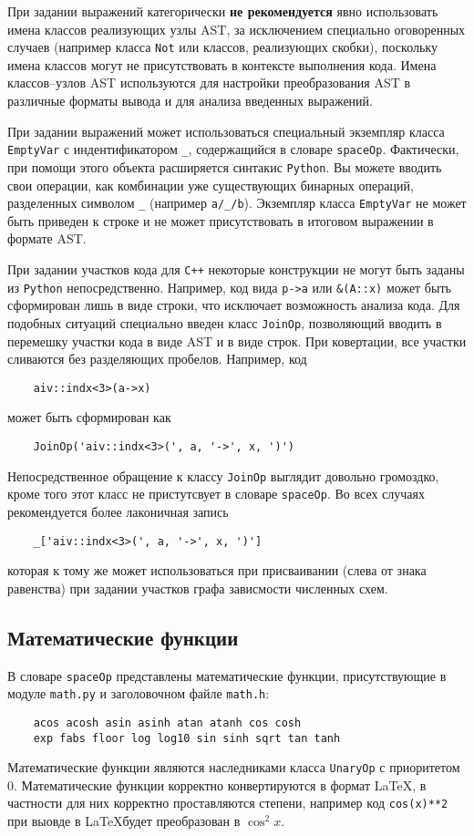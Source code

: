 При задании выражений категорически {\bf не рекомендуется} явно использовать имена классов реализующих узлы AST, за исключением специально оговоренных случаев 
(например класса \verb'Not' или классов, реализующих скобки), поскольку имена классов могут не присутствовать в контексте выполнения кода.
Имена классов--узлов AST используются для настройки преобразования AST в различные форматы вывода и для анализа введенных выражений.

При задании выражений может использоваться специальный экземпляр класса \verb'EmptyVar' с индентификатором \verb'_', содержащийся в словаре \verb'spaceOp'. 
Фактически, при помощи этого объекта расширяется синтакис \verb'Python'. Вы можете вводить свои операции, как комбинации уже существующих
бинарных операций, разделенных символом \verb'_' (например \verb'a/_/b'). Экземпляр класса \verb'EmptyVar' не может быть приведен к строке и не 
может присутствовать в итоговом выражении в формате AST. 

При задании участков кода для \verb'C++' некоторые конструкции не могут быть заданы из \verb'Python' непосредственно. Например, код вида \verb'p->a' или
\verb'&(A::x)' может быть сформирован лишь в виде строки, что исключает возможность анализа кода. Для подобных ситуаций специально введен класс \verb'JoinOp',
позволяющий вводить в перемешку участки кода в виде AST и в виде строк. При ковертации, все участки сливаются без разделяющих пробелов.  Например, код
\begin{verbatim}
    aiv::indx<3>(a->x)
\end{verbatim}
может быть сформирован как
\begin{verbatim}
    JoinOp('aiv::indx<3>(', a, '->', x, ')')
\end{verbatim}
Непосредственное обращение к классу \verb'JoinOp' выглядит довольно громоздко, кроме того этот класс не пристутсвует в словаре \verb'spaceOp'. 
Во всех случаях рекомендуется более лаконичная запись
\begin{verbatim}
    _['aiv::indx<3>(', a, '->', x, ')']
\end{verbatim}
которая к тому же может использоваться при присваивании (слева от знака равенства) при задании участков графа зависмости численных схем.

\subsection{Математические функции}
В словаре \verb'spaceOp' представлены математические функции, присутствующие в модуле \verb'math.py' и заголовочном файле \verb'math.h':
\begin{verbatim}
    acos acosh asin asinh atan atanh cos cosh 
    exp fabs floor log log10 sin sinh sqrt tan tanh
\end{verbatim}
Математические функции являются наследниками класса \verb'UnaryOp' с приоритетом 0. Математические функции корректно конвертируются в формат \LaTeX, в частности 
для них корректно проставляются степени, например код \verb'cos(x)**2' при выовде в \LaTeX будет преобразован в $\cos^2 x$. 


